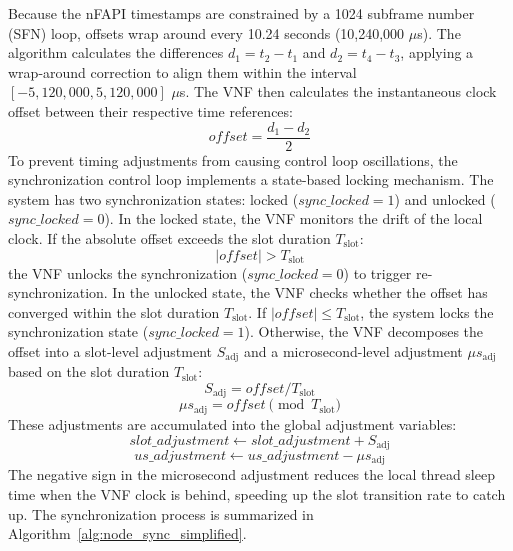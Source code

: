 \documentclass[../my_ntust_thesis.tex]{subfiles}
\begin{document}
Because the nFAPI timestamps are constrained by a 1024 subframe number (SFN) loop, offsets wrap around every 10.24 seconds (10,240,000 $\mu$s). The algorithm calculates the differences $d_1 = t_2 - t_1$ and $d_2 = t_4 - t_3$, applying a wrap-around correction to align them within the interval $[-5,120,000, 5,120,000]$ $\mu$s. The VNF then calculates the instantaneous clock offset between their respective time references:
\begin{equation}
\mathit{offset} = \frac{d_1 - d_2}{2}
\end{equation}
To prevent timing adjustments from causing control loop oscillations, the synchronization control loop implements a state-based locking mechanism. The system has two synchronization states: locked ($\mathit{sync\_locked} = 1$) and unlocked ($\mathit{sync\_locked} = 0$). In the locked state, the VNF monitors the drift of the local clock. If the absolute offset exceeds the slot duration $T_{\mathrm{slot}}$:
\begin{equation}
|\mathit{offset}| > T_{\mathrm{slot}}
\end{equation}
the VNF unlocks the synchronization ($\mathit{sync\_locked} = 0$) to trigger re-synchronization. In the unlocked state, the VNF checks whether the offset has converged within the slot duration $T_{\mathrm{slot}}$. If $|\mathit{offset}| \le T_{\mathrm{slot}}$, the system locks the synchronization state ($\mathit{sync\_locked} = 1$). Otherwise, the VNF decomposes the offset into a slot-level adjustment $S_{\mathrm{adj}}$ and a microsecond-level adjustment $\mu s_{\mathrm{adj}}$ based on the slot duration $T_{\mathrm{slot}}$:
\begin{equation}
S_{\mathrm{adj}} = \mathit{offset} / T_{\mathrm{slot}}
\end{equation}
\begin{equation}
\mu s_{\mathrm{adj}} = \mathit{offset} \pmod{T_{\mathrm{slot}}}
\end{equation}
These adjustments are accumulated into the global adjustment variables:
\begin{equation}
\mathit{slot\_adjustment} \gets \mathit{slot\_adjustment} + S_{\mathrm{adj}}
\end{equation}
\begin{equation}
\mathit{us\_adjustment} \gets \mathit{us\_adjustment} - \mu s_{\mathrm{adj}}
\end{equation}
The negative sign in the microsecond adjustment reduces the local thread sleep time when the VNF clock is behind, speeding up the slot transition rate to catch up. The synchronization process is summarized in Algorithm~\ref{alg:node_sync_simplified}.
\end{document}

